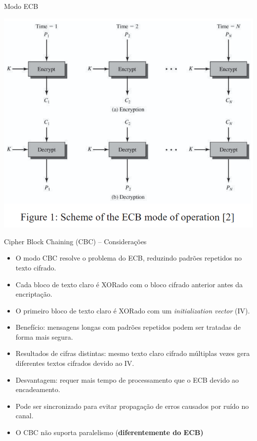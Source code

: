 \begin{frame}{Modo ECB}


    \centering
    \includegraphics[width=0.6\linewidth]{Figuras/aes-modo-ecb.png}

\end{frame}

\begin{frame}{Cipher Block Chaining (CBC) – Considerações}
    \begin{itemize}
        \item O modo CBC resolve o problema do ECB, reduzindo padrões repetidos no texto cifrado.
        \item Cada bloco de texto claro é XORado com o bloco cifrado anterior antes da encriptação.
        \item O primeiro bloco de texto claro é XORado com um \textit{initialization vector} (IV).
        \item Benefício: mensagens longas com padrões repetidos podem ser tratadas de forma mais segura.
        \item Resultados de cifras distintas: mesmo texto claro cifrado múltiplas vezes gera diferentes textos cifrados devido ao IV.
        \item Desvantagem: requer mais tempo de processamento que o ECB devido ao encadeamento.
        \item Pode ser sincronizado para evitar propagação de erros causados por ruído no canal.
        \item O CBC não suporta paralelismo (\textbf{diferentemente do ECB)}
    \end{itemize}
\end{frame}

